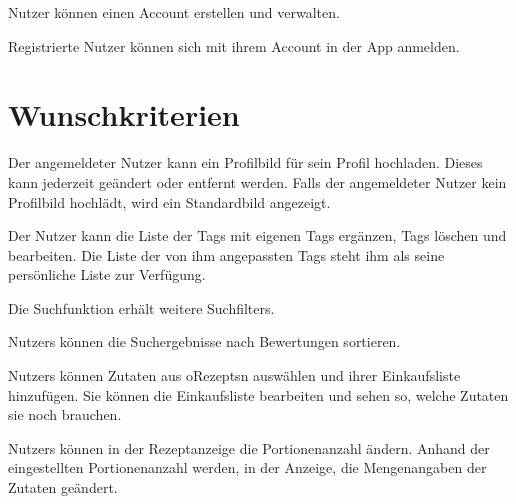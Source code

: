 \gls{Nutzer} können einen Account erstellen und verwalten.

Registrierte Nutzer können sich mit ihrem Account in der App anmelden.


		

\section{Wunschkriterien}


Der \gls{angemeldeter Nutzer} kann ein Profilbild für sein Profil hochladen. Dieses kann jederzeit geändert oder entfernt werden. Falls der \gls{angemeldeter Nutzer} kein Profilbild hochlädt, wird ein Standardbild angezeigt.
	

	
Der Nutzer kann die Liste der \glspl{Tag} mit eigenen Tags ergänzen, Tags löschen und bearbeiten. 
Die Liste der von ihm angepassten Tags steht ihm als seine persönliche Liste zur Verfügung. 

Die Suchfunktion erhält weitere \glspl{Suchfilter}.

\glspl{Nutzer} können die Suchergebnisse nach Bewertungen sortieren.

	
	

\glspl{Nutzer} können Zutaten aus \glspl{oRezept}n auswählen und ihrer Einkaufsliste hinzufügen. Sie können die Einkaufsliste bearbeiten und sehen so, welche Zutaten sie noch brauchen.



\glspl{Nutzer} können in der Rezeptanzeige die Portionenanzahl ändern. Anhand der eingestellten Portionenanzahl werden, in der Anzeige, die Mengenangaben der Zutaten geändert. 



